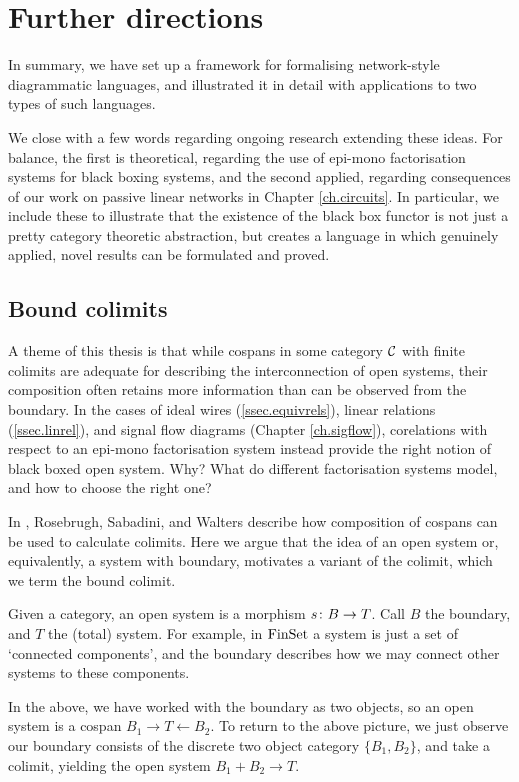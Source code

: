 \chapter{Further directions} \label{ch.further}
In summary, we have set up a framework for formalising network-style
diagrammatic languages, and illustrated it in detail with applications to two
types of such languages.

We close with a few words regarding ongoing research extending these ideas. For
balance, the first is theoretical, regarding the use of epi-mono factorisation
systems for black boxing systems, and the second applied, regarding consequences
of our work on passive linear networks in Chapter \ref{ch.circuits}. In
particular, we include these to illustrate that the existence of the black
box functor is not just a pretty category theoretic abstraction, but creates a
language in which genuinely applied, novel results can be formulated and proved.

\section{Bound colimits}

A theme of this thesis is that while cospans in some category $\mathcal C$ with
finite colimits are adequate for describing the interconnection of open systems,
their composition often retains more information than can be observed from the
boundary. In the cases of ideal wires (\textsection\ref{ssec.equivrels}), linear
relations (\textsection\ref{ssec.linrel}), and signal flow diagrams (Chapter
\ref{ch.sigflow}), corelations with respect to an epi-mono factorisation system
instead provide the right notion of black boxed open system. Why? What do
different factorisation systems model, and how to choose the right one?

In \cite{RSW08}, Rosebrugh, Sabadini, and Walters describe how composition of
\linebreak
cospans can be used to calculate colimits. Here we argue that the idea of an
open system or, equivalently, a system with boundary, motivates a variant of
the colimit, which we term the bound colimit.

Given a category, an open system is a morphism $s{\colon} B \to T$. Call $B$ the
boundary, and $T$ the (total) system. For example, in $\mathrm{FinSet}$ a system is just
a set of `connected components', and the boundary describes how we may connect
other systems to these components.

In the above, we have worked with the boundary as two objects, so an open
system is a cospan $B_1 \to T \leftarrow B_2$. To return to the above picture,
we just observe our boundary consists of the discrete two object category
$\{B_1,B_2\}$, and take a colimit, yielding the open system $B_1+B_2 \to T$.

